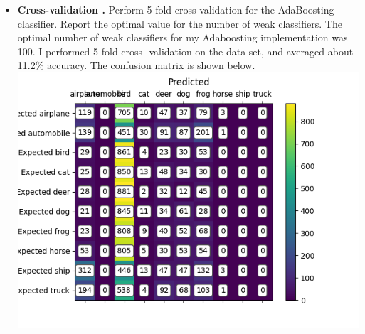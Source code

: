 \documentclass[11pt]{article}
\begin{document}
\begin{itemize}
        \item \textbf{Cross-validation .} Perform 5-fold cross-validation for the AdaBoosting classifier.
        Report the optimal value for the number of weak classifiers.\newline
        The optimal number of weak classifiers for my Adaboosting implementation was 100. I performed 5-fold cross
        -validation on the data set, and averaged about 11.2\% accuracy. The confusion matrix is shown below.\newline
        \includegraphics[width=\textwidth]{Output Pictures/Confusion Matrix AdaBoost}
    \end{itemize}
\end{document}
